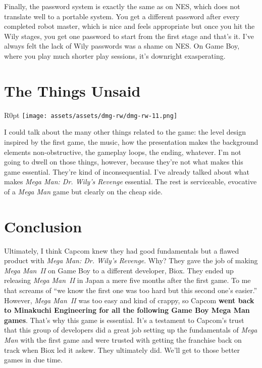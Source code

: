 \documentclass{book}
\begin{document}
Finally, the password system is exactly the same as on NES, which does not translate well to a portable system. You get a different password after every completed robot master, which is nice and feels appropriate but once you hit the Wily stages, you get one password to start from the first stage and that’s it. I’ve always felt the lack of Wily passwords was a shame on NES. On Game Boy, where you play much shorter play sessions, it’s downright exasperating.

\FloatBarrier\needspace{5pt}\section*{The Things Unsaid}\nopagebreak[4]

\begin{wrapfigure}{R}{0pt} \texttt{[image: assets/assets/dmg-rw/dmg-rw-11.png]}\end{wrapfigure}
I could talk about the many other things related to the game: the level design inspired by the first game, the music, how the presentation makes the background elements non-obstructive, the gameplay loops, the ending, whatever. I’m not going to dwell on those things, however, because they’re not what makes this game essential. They’re kind of inconsequential. I’ve already talked about what makes \emph{Mega Man: Dr. Wily’s Revenge} essential. The rest is serviceable, evocative of a \emph{Mega Man} game but clearly on the cheap side.

\FloatBarrier\needspace{5pt}\section*{Conclusion}\nopagebreak[4]

Ultimately, I think Capcom knew they had good fundamentals but a flawed product with \emph{Mega Man: Dr. Wily’s Revenge}. Why? They gave the job of making \emph{Mega Man II} on Game Boy to a different developer, Biox. They ended up releasing \emph{Mega Man II} in Japan a mere five months after the first game. To me that screams of “we know the first one was too hard but this second one’s easier.” However, \emph{Mega Man II} was too easy and kind of crappy, so Capcom \textbf{went back to Minakuchi Engineering for all the following Game Boy Mega Man games}. That’s why this game is essential. It’s a testament to Capcom’s trust that this group of developers did a great job setting up the fundamentals of \emph{Mega Man} with the first game and were trusted with getting the franchise back on track when Biox led it askew. They ultimately did. We’ll get to those better games in due time.
\end{document}
